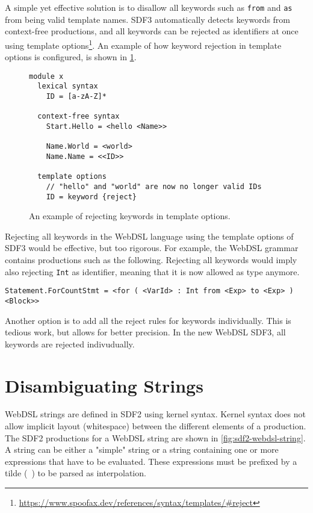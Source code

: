       A simple yet effective solution is to disallow all keywords such as \texttt{from} and \texttt{as} from being valid template names. SDF3 automatically detects keywords from context-free productions, and all keywords can be rejected as identifiers at once using template options\footnote{\url{https://www.spoofax.dev/references/syntax/templates/\#reject}}. An example of how keyword rejection in template options is configured, is shown in \cref{fig:sdf3-template-options-reject}.

      \begin{figure}
        \begin{verbatim}
module x
  lexical syntax
    ID = [a-zA-Z]*

  context-free syntax
    Start.Hello = <hello <Name>>

    Name.World = <world>
    Name.Name = <<ID>>

  template options
    // "hello" and "world" are now no longer valid IDs
    ID = keyword {reject}
        \end{verbatim}
        \caption{\label{fig:sdf3-template-options-reject}An example of rejecting keywords in template options.}
      \end{figure}

      Rejecting all keywords in the WebDSL language using the template options of SDF3 would be effective, but too rigorous. For example, the WebDSL grammar contains productions such as the following. Rejecting all keywords would imply also rejecting \texttt{Int} as identifier, meaning that it is now allowed as type anymore.
      
      \texttt{Statement.ForCountStmt = <for ( <VarId> : Int from <Exp> to <Exp> ) <Block>>}

      Another option is to add all the reject rules for keywords individually. This is tedious work, but allows for better precision. In the new WebDSL SDF3, all keywords are rejected indivudually.

    \section{Disambiguating Strings}

      WebDSL strings are defined in SDF2 using kernel syntax. Kernel syntax does not allow implicit layout (whitespace) between the different elements of a production. The SDF2 productions for a WebDSL string are shown in \cref{fig:sdf2-webdsl-string}. A string can be either a "simple" string or a string containing one or more expressions that have to be evaluated. These expressions must be prefixed by a tilde (\texttt{~}) to be parsed as interpolation.

